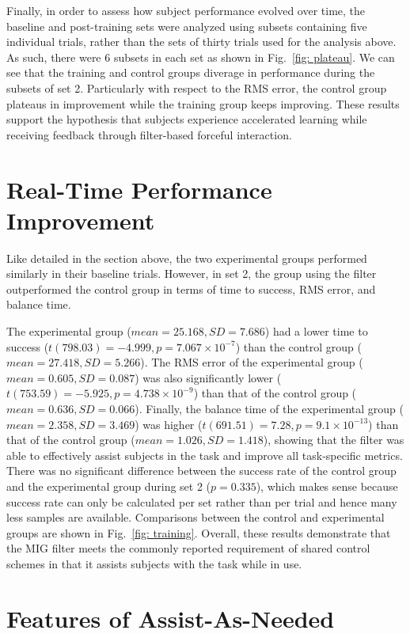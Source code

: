 Finally, in order to assess how subject performance evolved over time, the baseline and post-training sets were analyzed using subsets containing five individual trials, rather than the sets of thirty trials used for the analysis above. As such, there were 6 subsets in each set as shown in Fig.~\ref{fig: plateau}. We can see that the training and control groups diverage in performance during the subsets of set 2. Particularly with respect to the RMS error, the control group plateaus in improvement while the training group keeps improving. These results support the hypothesis that subjects experience accelerated learning while receiving feedback through filter-based forceful interaction. 

 
\section{Real-Time Performance Improvement}

Like detailed in the section above, the two experimental groups performed similarly in their baseline trials. However, in set 2, the group using the filter outperformed the control group in terms of time to success, RMS error, and balance time.

The experimental group ($mean = 25.168, SD = 7.686$) had a lower time to success ($t(798.03) = -4.999, p = 7.067 \times {10}^{-7} $) than the control group ($mean = 27.418, SD = 5.266$). The RMS error of the experimental group ($mean = 0.605, SD = 0.087$) was also significantly lower ($t(753.59) = -5.925, p = 4.738 \times {10}^{-9} $) than that of the control group ($mean = 0.636, SD = 0.066$). Finally, the balance time of the experimental group ($mean = 2.358, SD = 3.469$) was higher ($t(691.51) = 7.28, p = 9.1 \times {10}^{-13}$) than that of the control group ($mean = 1.026, SD = 1.418$), showing that the filter was able to effectively assist subjects in the task and improve all task-specific metrics. There was no significant difference between the success rate of the control group and the experimental group during set 2 ($p = 0.335$), which makes sense because success rate can only be calculated per set rather than per trial and hence many less samples are available. Comparisons between the control and experimental groups are shown in Fig.~\ref{fig: training}. Overall, these results demonstrate that the MIG filter meets the commonly reported requirement of shared control schemes in that it assists subjects with the task while in use. 
 
 
\section{Features of Assist-As-Needed}
\label{skill correlation}

